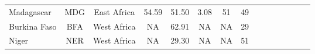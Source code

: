 {\begin{longtable}{lcccccccccccccc}
Madagascar                        & MDG           & East Africa        & 54.59             & 51.50               & 3.08               & 51            & 49              \\
Burkina Faso                      & BFA           & West Africa        & NA                & 62.91               & NA                 & NA            & 29              \\
Niger                             & NER           & West Africa        & NA                & 29.30               & NA                 & NA            & 51      \\   \hline  \hline
 \end{longtable}
 }
\endgroup